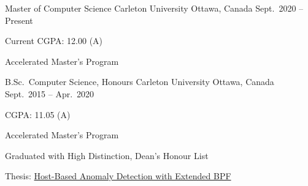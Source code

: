 

\begin{cventries}

  \cventry
    {Master of Computer Science} %
    {Carleton University} %
    {Ottawa, Canada} %
    {Sept.~2020 -- Present} %
    {
      \begin{cvitems} %
        \item {Current CGPA: 12.00 (A)}
        \item {Accelerated Master's Program}
      \end{cvitems}
    }

  \cventry
    {B.Sc.~Computer Science, Honours} %
    {Carleton University} %
    {Ottawa, Canada} %
    {Sept.~2015 -- Apr.~2020} %
    {
      \begin{cvitems} %
        \item {CGPA: 11.05 (A)}
        \item {Accelerated Master's Program}
        \item {Graduated with High Distinction, Dean's Honour List}
        \item {Thesis: \href{https://www.cisl.carleton.ca/~will/written/coursework/undergrad-ebpH-thesis.pdf}
          {Host-Based Anomaly Detection with Extended BPF}}
      \end{cvitems}
    }

\end{cventries}
